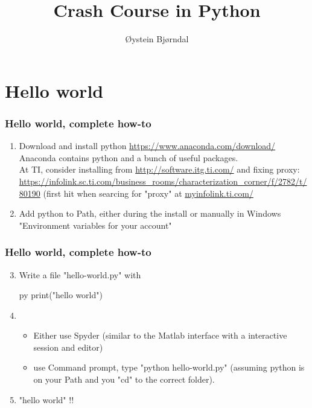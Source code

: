\documentclass[12pt]{beamer}
\begin{document}

\title{Crash Course in Python}
\author{Øystein Bjørndal}
\begin{frame}[fragile]
\maketitle
\end{frame}

\begin{frame}[fragile]
\tableofcontents
\end{frame}

\section{Hello world}
\begin{frame}[fragile]
\frametitle{Hello world, complete how-to}
\begin{enumerate}
\item Download and install python
\url{https://www.anaconda.com/download/} \\
Anaconda contains python and a bunch of useful packages. \\
At TI, consider installing from \url{http://software.itg.ti.com/} and fixing proxy: \url{https://infolink.sc.ti.com/business_rooms/characterization_corner/f/2782/t/80190}
(first hit when searcing for "proxy" at \url{myinfolink.ti.com/}
\item Add python to Path, either during the install or manually in Windows "Environment variables for your account"
\end{enumerate}
\end{frame}

\begin{frame}[fragile]
\frametitle{Hello world, complete how-to}
\begin{enumerate}
\setcounter{enumi}{2}
\item Write a file "hello-world.py" with
\begin{pygments}{py}
print("hello world")
\end{pygments}
\item \begin{itemize}
\item  Either use Spyder (similar to the Matlab interface with a interactive session and editor)
\item use Command prompt, type "python hello-world.py" (assuming python is on your Path
and you "cd" to the correct folder).
\end{itemize}
\item "hello world" !!
\end{enumerate}
\end{frame}
\end{document}
